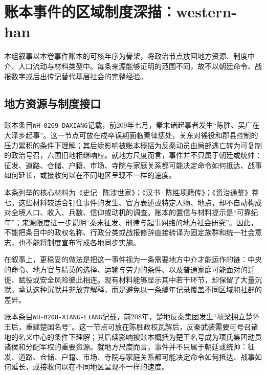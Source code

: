 \section{账本事件的区域制度深描：western-han}

\label{sec:ledger-depth-western-han}

本组叙事以本卷事件账本的可核年序为骨架，将政治节点放回地方资源、制度中介、人口流动与材料类型中。每条来源能够证明的范围不同，故不以朝廷命令、战报数字或后出传记替代基层社会的完整经验。

\subsection{地方资源与制度接口}

账本条目\texttt{WH-0209-DAXIANG}记载，前209年七月，秦末诸起事者发生“陈胜、吴广在大泽乡起事”。这一节点可放在戍卒误期面临秦律惩处，关东对徭役和郡县控制的压力累积的条件下理解；其后续影响被账本概括为反秦动员由局部逃亡转为可复制的政治号召，六国旧地相继响应。就地方尺度而言，事件并不只属于朝廷或统帅：征发、道路、仓储、户籍、市场、寺院与家庭关系都可能决定命令如何抵达、战事如何延长，或接收何以在不同地区呈现不一样的速度。

本条列举的核心材料为《史记·陈涉世家》；《汉书·陈胜项籍传》；《资治通鉴》卷七。这些材料较适合钉住事件的发生、官方表述或特定人物、地点，却不自动构成对全境人口、收入、兵数、信仰或动机的调查。账本的置信与材料提示是“可靠纪年”；来源限度进一步说明“秦末征发、刑律与起事网络的地方社会研究”。因此，不能把条目中的政权名称、行政分类或战报修辞直接转译为固定族群和统一社会意志，也不能将制度宣布写成各地同步实施。

在叙事上，更稳妥的做法是把这一事件视为一条需要地方中介才能运作的链：中央的命令、地方官与精英的选择、运输与劳力的条件、以及普通家庭可能面对的迁徙、赋役或安全风险彼此相连。现有材料能够显示其中若干环节，却保留了大量沉默。承认这种沉默并非放弃解释，而是避免以一条编年记录覆盖不同区域和社群的差异。

账本条目\texttt{WH-0208-XIANG-LIANG}记载，前208年，楚地反秦集团发生“项梁拥立楚怀王后，重建楚国名号”。这一节点可放在陈胜政权瓦解后，反秦武装需要可号召诸地的名义中心的条件下理解；其后续影响被账本概括为楚王名号成为项氏集团动员诸侯和分配军权的重要资源。就地方尺度而言，事件并不只属于朝廷或统帅：征发、道路、仓储、户籍、市场、寺院与家庭关系都可能决定命令如何抵达、战事如何延长，或接收何以在不同地区呈现不一样的速度。

